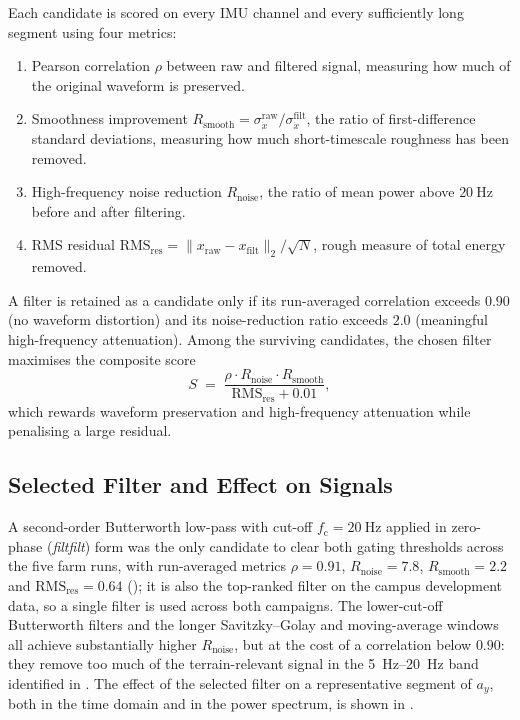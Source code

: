 Each candidate is scored on every IMU channel and every sufficiently long segment using four metrics:
\begin{enumerate}
    \item Pearson correlation $\rho$ between raw and filtered signal, measuring how much of the original waveform is preserved.
    \item Smoothness improvement $R_{\mathrm{smooth}} = \sigma_{\dot{x}}^{\mathrm{raw}} / \sigma_{\dot{x}}^{\mathrm{filt}}$, the ratio of first-difference standard deviations, measuring how much short-timescale roughness has been removed.
    \item High-frequency noise reduction $R_{\mathrm{noise}}$, the ratio of mean power above $\SI{20}{\hertz}$ before and after filtering.
    \item RMS residual $\mathrm{RMS}_{\mathrm{res}} = \|x_{\mathrm{raw}} - x_{\mathrm{filt}}\|_2 / \sqrt{N}$, rough measure of total energy removed.
\end{enumerate}
A filter is retained as a candidate only if its run-averaged correlation exceeds $0.90$ (no waveform distortion) and its noise-reduction ratio exceeds $2.0$ (meaningful high-frequency attenuation). Among the surviving candidates, the chosen filter maximises the composite score
\begin{equation}
    S \;=\; \frac{\rho \cdot R_{\mathrm{noise}} \cdot R_{\mathrm{smooth}}}{\mathrm{RMS}_{\mathrm{res}} + 0.01},
    \label{eq:filter_score}
\end{equation}
which rewards waveform preservation and high-frequency attenuation while penalising a large residual.

\subsection{Selected Filter and Effect on Signals}

A second-order Butterworth low-pass with cut-off $f_{\mathrm{c}} = \SI{20}{\hertz}$ applied in zero-phase (\emph{filtfilt}) form was the only candidate to clear both gating thresholds across the five farm runs, with run-averaged metrics $\rho = 0.91$, $R_{\mathrm{noise}} = 7.8$, $R_{\mathrm{smooth}} = 2.2$ and $\mathrm{RMS}_{\mathrm{res}} = 0.64$ (); it is also the top-ranked filter on the campus development data, so a single filter is used across both campaigns. The lower-cut-off Butterworth filters and the longer Savitzky--Golay and moving-average windows all achieve substantially higher $R_{\mathrm{noise}}$, but at the cost of a correlation below $0.90$: they remove too much of the terrain-relevant signal in the \SIrange{5}{20}{\hertz} band identified in . The effect of the selected filter on a representative segment of $a_y$, both in the time domain and in the power spectrum, is shown in .

